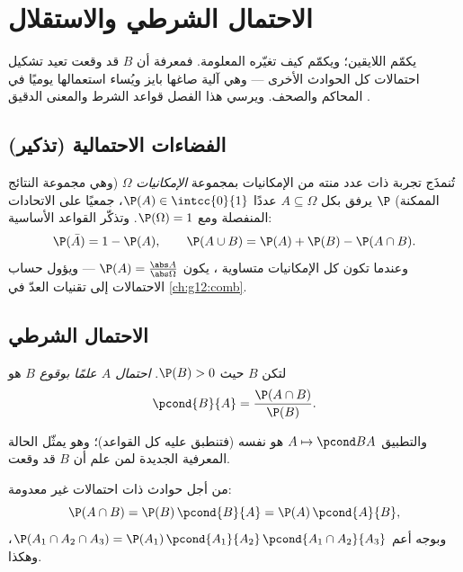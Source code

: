 \chapter{الاحتمال الشرطي والاستقلال}\label{ch:g12:condprob}

يكمّم  اللايقين؛ ويكمّم  كيف
تغيّره المعلومة. فمعرفة أن  $B$ قد وقعت تعيد تشكيل
احتمالات كل الحوادث الأخرى --- وهي آلية صاغها بايز
ويُساء استعمالها يوميًا في المحاكم والصحف. ويرسي هذا الفصل قواعد
الشرط والمعنى الدقيق .

\section{الفضاءات الاحتمالية (تذكير)}

تُنمذَج تجربة ذات عدد منته من الإمكانيات بمجموعة \emph{الإمكانيات}
$\Omega$ (وهي مجموعة النتائج الممكنة)  $\P$ يرفق
بكل  $A \subseteq \Omega$ عددًا $\P(A) \in \intcc{0}{1}$، جمعيًا
على الاتحادات المنفصلة ومع $\P(\Omega) = 1$. وتذكّر القواعد الأساسية:
\[
\P(\bar A) = 1 - \P(A),
\qquad
\P(A \cup B) = \P(A) + \P(B) - \P(A \cap B).
\]
وعندما تكون كل الإمكانيات متساوية ، يكون
$\P(A) = \frac{\abs A}{\abs\Omega}$ --- ويؤول حساب الاحتمالات
إلى تقنيات العدّ في \cref{ch:g12:comb}.

\section{الاحتمال الشرطي}

\begin{definition}\label{def:g12:condprob:cond}
لتكن $B$  حيث $\P(B) > 0$. \emph{احتمال $A$ علمًا بوقوع
$B$} هو
\[
\pcond{B}{A} = \frac{\P(A \cap B)}{\P(B)} .
\]
\end{definition}

والتطبيق $A \mapsto \pcond BA$ هو نفسه  (فتنطبق عليه كل القواعد)؛ وهو
يمثّل الحالة المعرفية الجديدة لمن علم أن $B$ قد
وقعت.

\begin{proposition}\label{prop:g12:condprob:product}
من أجل حوادث ذات احتمالات غير معدومة:
\[
\P(A \cap B) = \P(B)\,\pcond{B}{A} = \P(A)\,\pcond{A}{B},
\]
وبوجه أعم
$\P(A_1 \cap A_2 \cap A_3) = \P(A_1)\,\pcond{A_1}{A_2}\,
\pcond{A_1 \cap A_2}{A_3}$، وهكذا.
\end{proposition}

